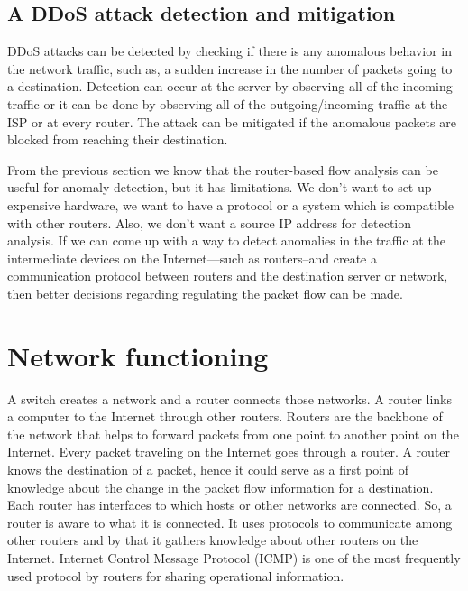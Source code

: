\documentclass[12pt,oneside,a4paper]{article}
\begin{document}
\subsection{A DDoS attack detection and mitigation}

DDoS attacks can be detected by checking if there is any anomalous behavior in the network traffic, such as, a sudden increase in the number of packets going to a destination. Detection can occur at the server by observing all of the incoming traffic or it can be done by observing all of the outgoing/incoming traffic at the ISP or at every router. The attack can be mitigated if the anomalous packets are blocked from reaching their destination.

From the previous section we know that the router-based flow analysis can be useful for anomaly detection, but it has limitations. We don't want to set up expensive hardware, we want to have a protocol or a system which is compatible with other routers. Also, we don't want a source IP address for detection analysis. If we can come up with a way to detect anomalies in the traffic at the intermediate devices on the Internet---such as routers--and create a communication protocol between routers and the destination server or network, then better decisions regarding regulating the packet flow can be made.

\pagebreak
\section{Network functioning}

A switch creates a network and a router connects those networks. A router links a computer to the Internet through other routers. Routers are the backbone of the network that helps to forward packets from one point to another point on the Internet. Every packet traveling on the Internet goes through a router\cite{router-switch}. A router knows the destination of a packet, hence it could serve as a first point of knowledge about the change in the packet flow information for a destination. Each router has interfaces to which hosts or other networks are connected. So, a router is aware to what it is connected. It uses protocols to communicate among other routers and by that it gathers knowledge about other routers on the Internet.  Internet Control Message Protocol (ICMP)\cite{icmp} is one of the most frequently used protocol by routers for sharing operational information.\par
\end{document}
